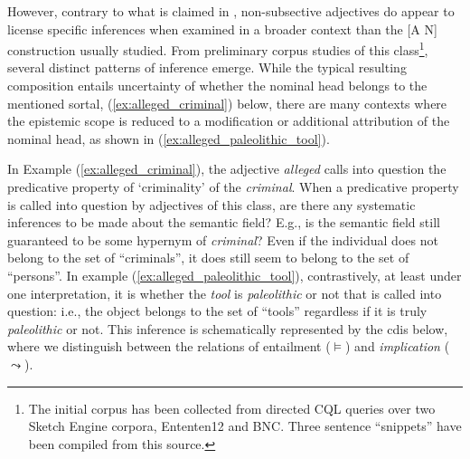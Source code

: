 \documentclass[10pt]{article}
\begin{document}
\noindent However, contrary to what is claimed in \cite{amoia2006adjective}, non-subsective adjectives do appear to license specific inferences when examined in a broader context than the [A N] construction usually studied. From preliminary corpus studies of this class\footnote{The initial corpus has been collected from directed CQL queries over  two Sketch Engine corpora, Ententen12 and BNC. Three sentence ``snippets'' have been compiled from this source.}, several distinct patterns of inference emerge. While the typical resulting composition entails  uncertainty of 
 whether the nominal head belongs to the mentioned sortal, (\ref{ex:alleged_criminal}) below, there are many contexts where the epistemic scope is reduced to  a modification or additional attribution of the nominal head, as shown in  (\ref{ex:alleged_paleolithic_tool}). 

\vspace{-0.5em}
\vspace{-0.5em}

\noindent 
In Example (\ref{ex:alleged_criminal}), the adjective \emph{alleged} calls into question the predicative property of `criminality' of the \emph{criminal}. When a predicative property is called into question by adjectives of this class, are
there any systematic inferences to be made about the semantic field? E.g., is the semantic field still guaranteed to be some hypernym of
\emph{criminal}? Even if the individual does not belong to the set of
``criminals'', it does still seem to belong to the set of ``persons''. In
example (\ref{ex:alleged_paleolithic_tool}), contrastively, at least under one
interpretation, it is whether the \emph{tool} is \emph{paleolithic} or not that
is called into question: i.e., the object belongs to the set of ``tools''
regardless if it is truly \emph{paleolithic} or not.
This inference is schematically represented by the {\sc cdi}s below, where we distinguish between  the relations of entailment ($\vDash$) and {\it implication} ($\leadsto$). 

\vspace{-0.5em}
\vspace{-0.5em}
\end{document}
